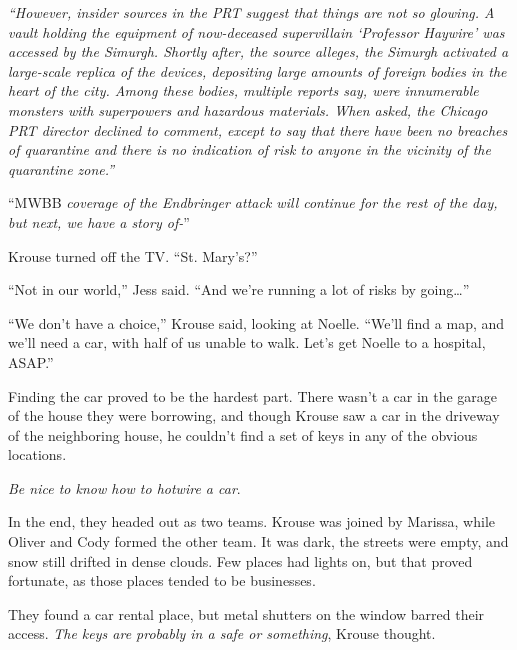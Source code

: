 \emph{``However, insider sources in the PRT suggest that things are not so glowing.  A vault holding the equipment of now-deceased supervillain `Professor Haywire' was accessed by the Simurgh.  Shortly after, the source alleges, the Simurgh activated a large-scale replica of the devices, depositing large amounts of foreign bodies in the heart of the city.  Among these bodies, multiple reports say, were innumerable monsters with superpowers and hazardous materials.  When asked, the Chicago PRT director declined to comment, except to say that there have been no breaches of quarantine and there is no indication of risk to anyone in the vicinity of the quarantine zone.''}



``MWBB \emph{coverage of the Endbringer attack will continue for the rest of the day, but next, we have a story of-}''



Krouse turned off the TV.  ``St. Mary's?''



``Not in our world,'' Jess said.  ``And we're running a lot of risks by going\ldots''



``We don't have a choice,'' Krouse said, looking at Noelle. ``We'll find a map, and we'll need a car, with half of us unable to walk.  Let's get Noelle to a hospital, ASAP.''



\sectionbreak



Finding the car proved to be the hardest part.  There wasn't a car in the garage of the house they were borrowing, and though Krouse saw a car in the driveway of the neighboring house, he couldn't find a set of keys in any of the obvious locations.



\emph{Be nice to know how to hotwire a car}.



In the end, they headed out as two teams.  Krouse was joined by Marissa, while Oliver and Cody formed the other team.  It was dark, the streets were empty, and snow still drifted in dense clouds.  Few places had lights on, but that proved fortunate, as those places tended to be businesses.



They found a car rental place, but metal shutters on the window barred their access.  \emph{The keys are probably in a safe or something}, Krouse thought.



